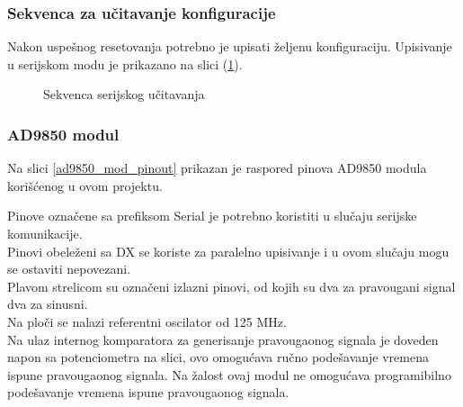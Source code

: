 \subsubsection{Sekvenca za učitavanje konfiguracije}

Nakon uspešnog resetovanja potrebno je upisati željenu konfiguraciju.
Upisivanje u serijskom modu je prikazano na slici (\ref{ad9850_load_seq}).

\begin{figure}[H]
  \centering{
    \scalebox{1.1}{
      
    }}
  \caption{Sekvenca serijskog učitavanja}
  \label{ad9850_load_seq}
\end{figure}

\newpage

\subsubsection{AD9850 modul}

Na slici \ref{ad9850_mod_pinout} prikazan je raspored pinova AD9850 modula
korišćenog u ovom projektu. \\

\begin{figure}[H]
\end{figure}


Pinove označene sa prefiksom Serial je potrebno koristiti u slučaju serijske
komunikacije. \\
Pinovi obeleženi sa DX se koriste za paralelno upisivanje i u ovom slučaju mogu
se ostaviti nepovezani. \\
Plavom strelicom su označeni izlazni pinovi, od kojih su dva za pravougani
signal dva za sinusni. \\

Na ploči se nalazi referentni oscilator od 125 MHz. \\

Na ulaz internog komparatora za generisanje pravougaonog signala je doveden
napon sa potenciometra na slici, ovo omogućava ručno podešavanje vremena ispune
pravougaonog signala.
Na žalost ovaj modul ne omogućava programibilno podešavanje vremena ispune
pravougaonog signala. \\